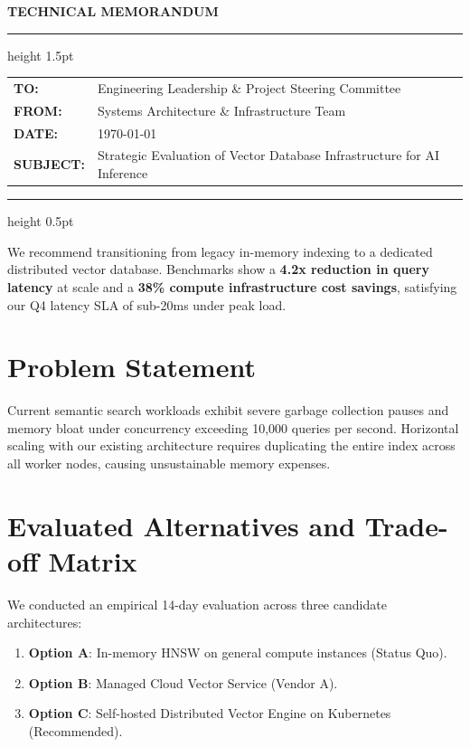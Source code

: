 \documentclass[11pt,letterpaper]{article}
\begin{document}
{\noindent\LARGE\bfseries\textcolor{headerblue}{TECHNICAL MEMORANDUM}}\\[0.8em]
\hrule height 1.5pt
\vspace{1em}

\noindent
\begin{tabular}{ll}
\textbf{TO:} & Engineering Leadership \& Project Steering Committee \\
\textbf{FROM:} & Systems Architecture \& Infrastructure Team \\
\textbf{DATE:} & \today \\
\textbf{SUBJECT:} & Strategic Evaluation of Vector Database Infrastructure for AI Inference \\
\end{tabular}

\vspace{1em}
\hrule height 0.5pt
\vspace{1.5em}

\begin{tcolorbox}[colback=lightgray, colframe=headerblue, arc=2mm, title=\textbf{Executive Recommendation}, fonttitle=\bfseries]
We recommend transitioning from legacy in-memory indexing to a dedicated distributed vector database. Benchmarks show a \textbf{4.2x reduction in query latency} at scale and a \textbf{38\% compute infrastructure cost savings}, satisfying our Q4 latency SLA of sub-20ms under peak load.
\end{tcolorbox}

\section*{Problem Statement}
Current semantic search workloads exhibit severe garbage collection pauses and memory bloat under concurrency exceeding 10,000 queries per second. Horizontal scaling with our existing architecture requires duplicating the entire index across all worker nodes, causing unsustainable memory expenses.

\section*{Evaluated Alternatives and Trade-off Matrix}
We conducted an empirical 14-day evaluation across three candidate architectures:
\begin{enumerate}
    \item \textbf{Option A}: In-memory HNSW on general compute instances (Status Quo).
    \item \textbf{Option B}: Managed Cloud Vector Service (Vendor A).
    \item \textbf{Option C}: Self-hosted Distributed Vector Engine on Kubernetes (Recommended).
\end{enumerate}
\end{document}
